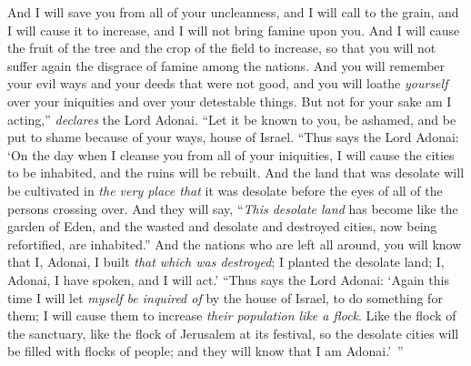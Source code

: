 \begin{biblechapter}
\verse And I will save you from all of your uncleanness, and I will call to the grain, and I will cause it to increase, and I will not bring famine upon you.
\verse And I will cause the fruit of the tree and the crop of the field to increase, so that you will not suffer again the disgrace of famine among the nations.
\verse And you will remember your evil ways and your deeds that were not good, and you will loathe \textit{yourself} over your iniquities and over your detestable things.
\verse But not for your sake am I acting,” \textit{declares} the Lord Adonai. “Let it be known to you, be ashamed, and be put to shame because of your ways, house of Israel.
\verse “Thus says the Lord Adonai: ‘On the day when I cleanse you from all of your iniquities, I will cause the cities to be inhabited, and the ruins will be rebuilt.
\verse And the land that was desolate will be cultivated in \textit{the very place that} it was desolate before the eyes of all of the persons crossing over.
\verse And they will say, “\textit{This desolate land} has become like the garden of Eden, and the wasted and desolate and destroyed cities, now being refortified, are inhabited.”
\verse And the nations who are left all around, you will know that I, Adonai, I built \textit{that which was destroyed}; I planted the desolate land; I, Adonai, I have spoken, and I will act.’
\verse “Thus says the Lord Adonai: ‘Again this time I will let \textit{myself be inquired of} by the house of Israel, to do something for them; I will cause them to increase \textit{their population like a flock}.
\verse Like the flock of the sanctuary, like the flock of Jerusalem at its festival, so the desolate cities will be filled with flocks of people; and they will know that I am Adonai.’ ”
\end{biblechapter}


